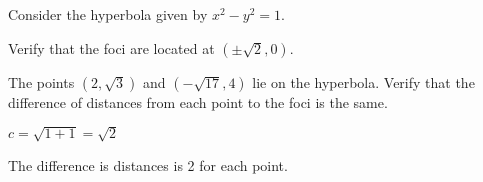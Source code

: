 {Consider the hyperbola given by $x^2-y^2=1$.
	\begin{enumext}[start=1]
	\item		Verify that the foci are located at $(\pm \sqrt{2},0)$.
	\item		The points $(2,\sqrt{3})$ and $(-\sqrt{17},4)$ lie on the hyperbola. Verify that the difference of distances from each point to the foci is the same.
	\end{enumext}
}
{\begin{enumext}[start=1]
\item		$c=\sqrt{1+1}=\sqrt{2}$
\item		The difference is distances is 2 for each point.
\end{enumext}
}
